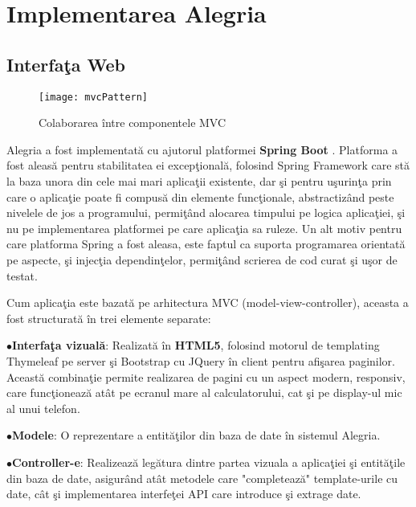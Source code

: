 \chapter{Implementarea Alegria}
\label{chapter:implemetare}
\newlength{\bulletwidth}\settowidth{\bulletwidth}{$\bullet$}
\newcommand{\mitem}{\setlength{\leftskip}{\leftmargin}\hspace*{-\labelsep}\hspace*{-\bulletwidth}$\bullet$\hspace*{\labelsep}}
\newcommand{\mend}{\setlength{\leftskip}{0cm}}
\section{Interfaţa Web}
\begin{wrapfigure}{r}{0.35\textwidth}
	\centering
	\captionsetup{justification=centering}
	\texttt{[image: mvcPattern]}
	\caption{Colaborarea între componentele MVC}
\end{wrapfigure}
Alegria a fost implementată cu ajutorul platformei \textbf{Spring Boot} \autocite{SpringBoot}. Platforma a fost aleasă pentru stabilitatea ei excepţională, folosind Spring Framework care stă la baza unora din cele mai mari aplicaţii existente\autocite{springUseCase}, dar şi pentru uşurinţa prin care o aplicaţie poate fi compusă din elemente funcţionale, abstractizând peste nivelele de jos a programului, permiţând alocarea timpului pe logica aplicaţiei, şi nu pe implementarea platformei pe care aplicaţia sa ruleze. Un alt motiv pentru care platforma Spring a fost aleasa, este faptul ca suporta programarea orientată pe aspecte, şi injecţia dependinţelor, permiţând scrierea de cod curat şi uşor de testat.

Cum aplicaţia este bazată pe arhitectura MVC (model-view-controller), aceasta a fost structurată în trei elemente separate: 

\mitem  \textbf{Interfaţa vizuală}: Realizată în \textbf{HTML5}, folosind motorul de templating Thymeleaf pe server şi Bootstrap cu JQuery în client pentru afişarea paginilor. Această combinaţie permite realizarea de pagini cu un aspect modern, responsiv, care funcţionează atât pe ecranul mare al calculatorului, cat şi pe display-ul mic al unui telefon.

\mitem  \textbf{Modele}: O reprezentare a entităţilor din baza de date în sistemul Alegria.

\mitem  \textbf{Controller-e}: Realizează legătura dintre partea vizuala a aplicaţiei şi entităţile din baza de date, asigurând atât metodele care "completează" template-urile cu date, cât şi implementarea interfeţei API care introduce şi extrage date.

